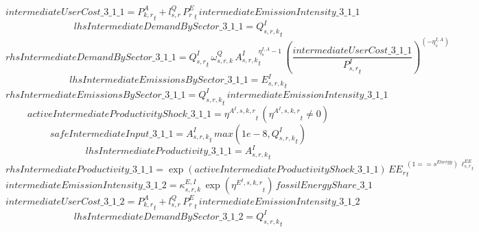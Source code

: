 \begin{dmath*}
intermediateUserCost\_3\_1\_1 = {{P^{A}_{k,r}}}_{t}+{{l^{Q}_{s,r}}}\, {{P^E_r}}_{t}\, {intermediateEmissionIntensity\_3\_1\_1}
\end{dmath*}
\begin{dmath*}
lhsIntermediateDemandBySector\_3\_1\_1 = {{Q^{I}_{s,r,k}}}_{t}
\end{dmath*}
\begin{dmath*}
rhsIntermediateDemandBySector\_3\_1\_1 = {{Q^{I}_{s,r}}}_{t}\, {{\omega^{Q}_{s,r,k}}}\, {{A^{I}_{s,r,k}}}_{t}^{{{\eta^{I,A}_{s}}}-1}\, \left(\frac{{intermediateUserCost\_3\_1\_1}}{{{P^{I}_{s,r}}}_{t}}\right)^{\left(-{{\eta^{I,A}_{s}}}\right)}
\end{dmath*}
\begin{dmath*}
lhsIntermediateEmissionsBySector\_3\_1\_1 = {{E^I_{s,r,k}}}_{t}
\end{dmath*}
\begin{dmath*}
rhsIntermediateEmissionsBySector\_3\_1\_1 = {{Q^{I}_{s,r,k}}}_{t}\, {intermediateEmissionIntensity\_3\_1\_1}
\end{dmath*}
\begin{dmath*}
activeIntermediateProductivityShock\_3\_1\_1 = {{\eta^{A^{I},s,k,r}}}_{t}\, \left({{\eta^{A^{I},s,k,r}}}_{t}\neq 0\right)
\end{dmath*}
\begin{dmath*}
safeIntermediateInput\_3\_1\_1 = {{A^{I}_{s,r,k}}}_{t}\, max(1e-8,{{Q^{I}_{s,r,k}}}_{t})
\end{dmath*}
\begin{dmath*}
lhsIntermediateProductivity\_3\_1\_1 = {{A^{I}_{s,r,k}}}_{t}
\end{dmath*}
\begin{dmath*}
rhsIntermediateProductivity\_3\_1\_1 = \exp\left({activeIntermediateProductivityShock\_3\_1\_1}\right)\, {{EE_r}}_{t}^{\left(1=={{s^{Energy}}}\right)\, {{\ell^{EE}_{s,r}}}_{t}}
\end{dmath*}
\begin{dmath*}
intermediateEmissionIntensity\_3\_1\_2 = {{\kappa^{E,I}_{s,r,k}}}\, \exp\left({{\eta^{E^{I},s,k,r}}}_{t}\right)\, {fossilEnergyShare\_3\_1}
\end{dmath*}
\begin{dmath*}
intermediateUserCost\_3\_1\_2 = {{P^{A}_{k,r}}}_{t}+{{l^{Q}_{s,r}}}\, {{P^E_r}}_{t}\, {intermediateEmissionIntensity\_3\_1\_2}
\end{dmath*}
\begin{dmath*}
lhsIntermediateDemandBySector\_3\_1\_2 = {{Q^{I}_{s,r,k}}}_{t}
\end{dmath*}

